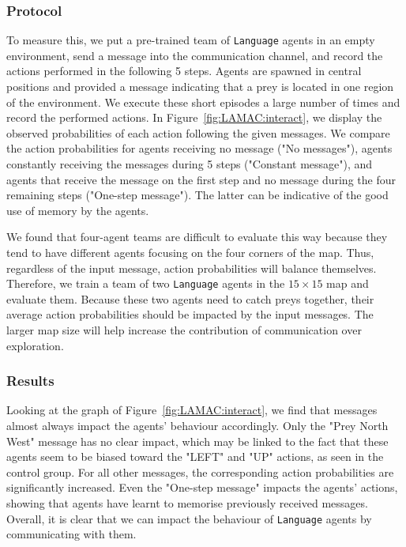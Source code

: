 \subsubsection{Protocol}

To measure this, we put a pre-trained team of \texttt{Language} agents in an empty environment, send a message into the communication channel, and record the actions performed in the following 5 steps. Agents are spawned in central positions and provided a message indicating that a prey is located in one region of the environment. We execute these short episodes a large number of times and record the performed actions. In Figure~\ref{fig:LAMAC:interact}, we display the observed probabilities of each action following the given messages. We compare the action probabilities for agents receiving no message ("No messages"), agents constantly receiving the messages during 5 steps ("Constant message"), and agents that receive the message on the first step and no message during the four remaining steps ("One-step message"). The latter can be indicative of the good use of memory by the agents. 

We found that four-agent teams are difficult to evaluate this way because they tend to have different agents focusing on the four corners of the map. Thus, regardless of the input message, action probabilities will balance themselves. Therefore, we train a team of two \texttt{Language} agents in the $15\times 15$ map and evaluate them. Because these two agents need to catch preys together, their average action probabilities should be impacted by the input messages. The larger map size will help increase the contribution of communication over exploration. 

\subsubsection{Results}

Looking at the graph of Figure~\ref{fig:LAMAC:interact}, we find that messages almost always impact the agents' behaviour accordingly. Only the "Prey North West" message has no clear impact, which may be linked to the fact that these agents seem to be biased toward the "LEFT" and "UP" actions, as seen in the control group. For all other messages, the corresponding action probabilities are significantly increased. Even the "One-step message" impacts the agents' actions, showing that agents have learnt to memorise previously received messages. Overall, it is clear that we can impact the behaviour of \texttt{Language} agents by communicating with them.














